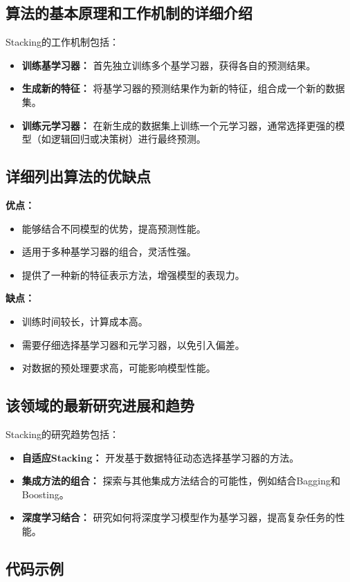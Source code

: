 \subsection*{算法的基本原理和工作机制的详细介绍}
Stacking的工作机制包括：
\begin{itemize}
    \item \textbf{训练基学习器：} 首先独立训练多个基学习器，获得各自的预测结果。
    \item \textbf{生成新的特征：} 将基学习器的预测结果作为新的特征，组合成一个新的数据集。
    \item \textbf{训练元学习器：} 在新生成的数据集上训练一个元学习器，通常选择更强的模型（如逻辑回归或决策树）进行最终预测。
\end{itemize}

\subsection*{详细列出算法的优缺点}
\textbf{优点：}
\begin{itemize}
    \item 能够结合不同模型的优势，提高预测性能。
    \item 适用于多种基学习器的组合，灵活性强。
    \item 提供了一种新的特征表示方法，增强模型的表现力。
\end{itemize}

\textbf{缺点：}
\begin{itemize}
    \item 训练时间较长，计算成本高。
    \item 需要仔细选择基学习器和元学习器，以免引入偏差。
    \item 对数据的预处理要求高，可能影响模型性能。
\end{itemize}

\subsection*{该领域的最新研究进展和趋势}
Stacking的研究趋势包括：
\begin{itemize}
    \item \textbf{自适应Stacking：} 开发基于数据特征动态选择基学习器的方法。
    \item \textbf{集成方法的组合：} 探索与其他集成方法结合的可能性，例如结合Bagging和Boosting。
    \item \textbf{深度学习结合：} 研究如何将深度学习模型作为基学习器，提高复杂任务的性能。
\end{itemize}
\subsection*{代码示例}
\begin{lstlisting}

\end{lstlisting}


